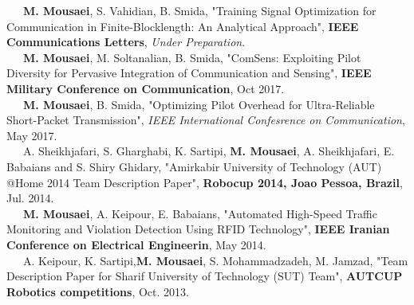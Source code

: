 


\bullet ~~~\textbf{M. Mousaei}, S. Vahidian, B. Smida, "Training Signal Optimization for Communication in Finite-Blocklength: An Analytical Approach", \textbf{IEEE Communications Letters}, \textit{Under Preparation}. \\
\bullet ~~~\textbf{M. Mousaei}, M. Soltanalian, B. Smida, "ComSens: Exploiting Pilot Diversity for Pervasive Integration of Communication and Sensing", \textbf{IEEE Military Conference on Communication}, Oct 2017. \\
\bullet ~~~\textbf{M. Mousaei}, B. Smida, "Optimizing Pilot Overhead for Ultra-Reliable Short-Packet Transmission", \textit{IEEE International Confesrence on Communication}, May 2017. \\
\bullet ~~~A. Sheikhjafari, S. Gharghabi, K. Sartipi, \textbf{M. Mousaei}, A. Sheikhjafari, E. Babaians and S. Shiry Ghidary, "Amirkabir University of Technology (AUT) @Home 2014 Team Description Paper", \textbf{Robocup 2014, Joao Pessoa, Brazil}, Jul. 2014.\\
\bullet ~~~\textbf{M. Mousaei}, A. Keipour, E. Babaians, "Automated High-Speed Traffic Monitoring and Violation Detection Using RFID Technology", \textbf{IEEE Iranian Conference on Electrical Engineerin}, May 2014. \\
\bullet ~~~A. Keipour, K. Sartipi,\textbf{M. Mousaei}, S. Mohammadzadeh, M. Jamzad, "Team Description Paper for Sharif University of Technology (SUT) Team", \textbf{AUTCUP Robotics competitions}, Oct. 2013.\\


\vspace{0.01cm}